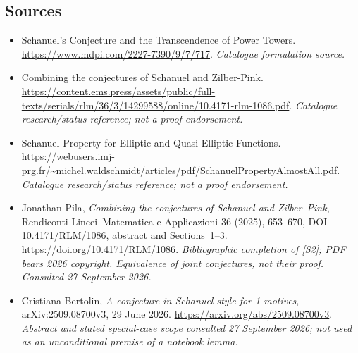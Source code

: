 \documentclass[11pt,a4paper]{article}
\numberwithin{equation}{section}
\begin{document}
\subsection{Sources}
\begin{itemize}\raggedright
\item[\textnormal{[S1]}]\hypertarget{source:28:1}{} Schanuel's Conjecture and the Transcendence of Power Towers.
\url{https://www.mdpi.com/2227-7390/9/7/717}.
{\small\textit{Catalogue formulation source.}}
\item[\textnormal{[S2]}]\hypertarget{source:28:2}{} Combining the conjectures of Schanuel and Zilber-Pink.
\url{https://content.ems.press/assets/public/full-texts/serials/rlm/36/3/14299588/online/10.4171-rlm-1086.pdf}.
{\small\textit{Catalogue research/status reference; not a proof endorsement.}}
\item[\textnormal{[S3]}]\hypertarget{source:28:3}{} Schanuel Property for Elliptic and Quasi-Elliptic Functions.
\url{https://webusers.imj-prg.fr/~michel.waldschmidt/articles/pdf/SchanuelPropertyAlmostAll.pdf}.
{\small\textit{Catalogue research/status reference; not a proof endorsement.}}
\item[\textnormal{[E1]}]\hypertarget{extra:28:1}{} Jonathan Pila,
\emph{Combining the conjectures of Schanuel and Zilber--Pink},
Rendiconti Lincei--Matematica e Applicazioni 36 (2025), 653--670,
DOI 10.4171/RLM/1086, abstract and Sections~1--3.
\url{https://doi.org/10.4171/RLM/1086}.
{\small\textit{Bibliographic completion of [S2]; PDF bears 2026 copyright.
Equivalence of joint conjectures, not their proof. Consulted 27 September 2026.}}
\item[\textnormal{[E2]}]\hypertarget{extra:28:2}{} Cristiana Bertolin,
\emph{A conjecture in Schanuel style for 1-motives},
arXiv:2509.08700v3, 29 June 2026.
\url{https://arxiv.org/abs/2509.08700v3}.
{\small\textit{Abstract and stated special-case scope consulted
27 September 2026; not used as an unconditional premise of a notebook lemma.}}

\end{itemize}

\end{document}
